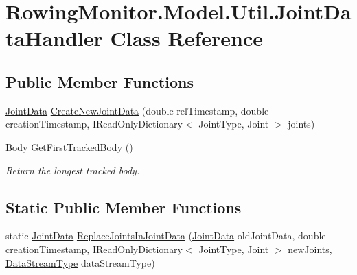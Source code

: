 \hypertarget{class_rowing_monitor_1_1_model_1_1_util_1_1_joint_data_handler}{}\section{Rowing\+Monitor.\+Model.\+Util.\+Joint\+Data\+Handler Class Reference}
\label{class_rowing_monitor_1_1_model_1_1_util_1_1_joint_data_handler}
\subsection*{Public Member Functions}
\begin{DoxyCompactItemize}
\item 
\hyperlink{struct_rowing_monitor_1_1_model_1_1_util_1_1_joint_data}{Joint\+Data} \hyperlink{class_rowing_monitor_1_1_model_1_1_util_1_1_joint_data_handler_af9945324e3ca88ac94ccc052f172f68d}{Create\+New\+Joint\+Data} (double rel\+Timestamp, double creation\+Timestamp, I\+Read\+Only\+Dictionary$<$ Joint\+Type, Joint $>$ joints)
\item 
Body \hyperlink{class_rowing_monitor_1_1_model_1_1_util_1_1_joint_data_handler_a93577e6689cfac35636d2a97f9ddee49}{Get\+First\+Tracked\+Body} ()
\begin{DoxyCompactList}\small\item\em Return the longest tracked body. \end{DoxyCompactList}\end{DoxyCompactItemize}
\subsection*{Static Public Member Functions}
\begin{DoxyCompactItemize}
\item 
static \hyperlink{struct_rowing_monitor_1_1_model_1_1_util_1_1_joint_data}{Joint\+Data} \hyperlink{class_rowing_monitor_1_1_model_1_1_util_1_1_joint_data_handler_a7fed5b351470a66f22bb242dee429b99}{Replace\+Joints\+In\+Joint\+Data} (\hyperlink{struct_rowing_monitor_1_1_model_1_1_util_1_1_joint_data}{Joint\+Data} old\+Joint\+Data, double creation\+Timestamp, I\+Read\+Only\+Dictionary$<$ Joint\+Type, Joint $>$ new\+Joints, \hyperlink{namespace_rowing_monitor_1_1_model_1_1_util_a01e1a06061533b246feb7421c9d0107f}{Data\+Stream\+Type} data\+Stream\+Type)
\end{DoxyCompactItemize}
